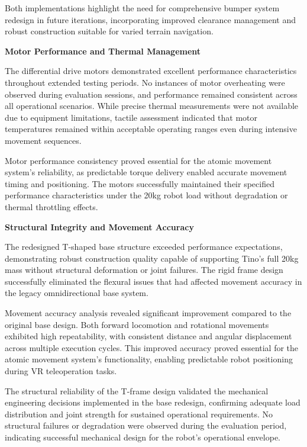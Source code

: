 Both implementations highlight the need for comprehensive bumper system redesign in future iterations, incorporating improved clearance management and robust construction suitable for varied terrain navigation.

\textbf{Motor Performance and Thermal Management}

The differential drive motors demonstrated excellent performance characteristics throughout extended testing periods. No instances of motor overheating were observed during evaluation sessions, and performance remained consistent across all operational scenarios. While precise thermal measurements were not available due to equipment limitations, tactile assessment indicated that motor temperatures remained within acceptable operating ranges even during intensive movement sequences.

Motor performance consistency proved essential for the atomic movement system's reliability, as predictable torque delivery enabled accurate movement timing and positioning. The motors successfully maintained their specified performance characteristics under the 20kg robot load without degradation or thermal throttling effects.

\textbf{Structural Integrity and Movement Accuracy}

The redesigned T-shaped base structure exceeded performance expectations, demonstrating robust construction quality capable of supporting Tino's full 20kg mass without structural deformation or joint failures. The rigid frame design successfully eliminated the flexural issues that had affected movement accuracy in the legacy omnidirectional base system.

Movement accuracy analysis revealed significant improvement compared to the original base design. Both forward locomotion and rotational movements exhibited high repeatability, with consistent distance and angular displacement across multiple execution cycles. This improved accuracy proved essential for the atomic movement system's functionality, enabling predictable robot positioning during VR teleoperation tasks.

The structural reliability of the T-frame design validated the mechanical engineering decisions implemented in the base redesign, confirming adequate load distribution and joint strength for sustained operational requirements. No structural failures or degradation were observed during the evaluation period, indicating successful mechanical design for the robot's operational envelope.

